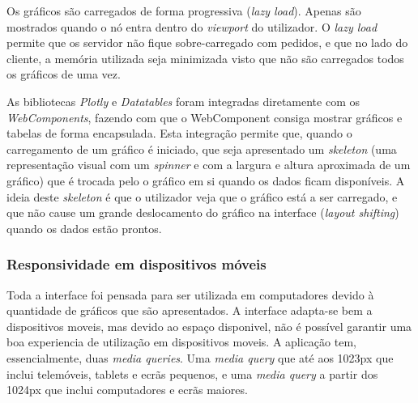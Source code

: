 Os gráficos são carregados de forma progressiva (\textit{lazy load}). Apenas são mostrados quando o nó entra dentro do \textit{viewport} do utilizador. O \textit{lazy load} permite que os servidor não fique sobre-carregado com pedidos, e que no lado do cliente, a memória utilizada seja minimizada visto que não são carregados todos os gráficos de uma vez.	

As bibliotecas \textit{Plotly} e \textit{Datatables} foram integradas diretamente com os \textit{WebComponents}\cite{webcomponents}, fazendo com que o WebComponent consiga mostrar gráficos e tabelas de forma encapsulada. Esta integração permite que, quando o carregamento de um gráfico é iniciado, que seja apresentado  um \textit{skeleton} (uma representação visual com um \textit{spinner} e com a largura e altura aproximada de um gráfico) que é trocada pelo o gráfico em si quando os dados ficam disponíveis. A ideia deste \textit{skeleton} é que o utilizador veja que o gráfico está a ser carregado, e que não cause um grande deslocamento do gráfico na interface (\textit{layout shifting}) quando os dados estão prontos.

\subsubsection{Responsividade em dispositivos móveis}

Toda a interface foi pensada para ser utilizada em computadores devido à quantidade de gráficos que são apresentados. A interface adapta-se bem a dispositivos moveis, mas devido ao espaço disponivel, não é possível garantir uma boa experiencia de utilização em dispositivos moveis. A aplicação tem, essencialmente, duas \textit{media queries}. Uma \textit{media query} que até aos 1023px que inclui telemóveis, tablets e ecrãs pequenos, e uma \textit{media query} a partir dos 1024px que inclui computadores e ecrãs maiores.

